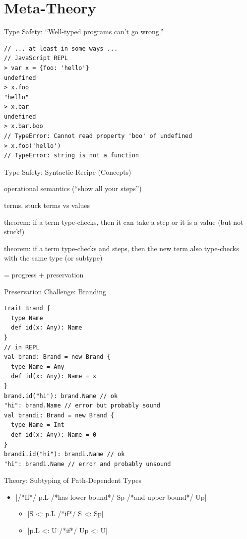\documentclass{beamer}
\begin{document}
\section{Meta-Theory}

\begin{frame}[fragile]{Type Safety: ``Well-typed programs can't go wrong.''}
\begin{verbatim}
// ... at least in some ways ...
// JavaScript REPL
> var x = {foo: 'hello'}
undefined
> x.foo
"hello"
> x.bar
undefined
> x.bar.boo
// TypeError: Cannot read property 'boo' of undefined
> x.foo('hello')
// TypeError: string is not a function
\end{verbatim}
\end{frame}

\begin{frame}[fragile]{Type Safety: Syntactic Recipe (Concepts)}
\begin{description}[preservation]
\item[small-step] operational semantics (``show all your steps'')
\item[irreducible] terms, stuck terms vs values
\item[progress] theorem: if a term type-checks, then it can take a step or it is a value (but not stuck!)
\item[preservation] theorem: if a term type-checks and steps, then the new term also type-checks with the same type (or subtype)
\item[type safety] = progress + preservation
\end{description}
\end{frame}

\begin{frame}[fragile]{Preservation Challenge: Branding}
\begin{verbatim}
trait Brand {
  type Name
  def id(x: Any): Name
}
// in REPL
val brand: Brand = new Brand {
  type Name = Any
  def id(x: Any): Name = x
}
brand.id("hi"): brand.Name // ok
"hi": brand.Name // error but probably sound
val brandi: Brand = new Brand {
  type Name = Int
  def id(x: Any): Name = 0
}
brandi.id("hi"): brandi.Name // ok
"hi": brandi.Name // error and probably unsound
\end{verbatim}
\end{frame}

\begin{frame}[fragile]{Theory: Subtyping of Path-Dependent Types}
\begin{itemize}
\item {}|/*If*/ p.L /*has lower bound*/ Sp /*and upper bound*/ Up|
\begin{itemize}
\item {}|S   <: p.L /*if*/ S   <: Sp|
\item {}|p.L <: U   /*if*/ Up  <: U|
\end{itemize}
\end{itemize}
\end{frame}
\end{document}
